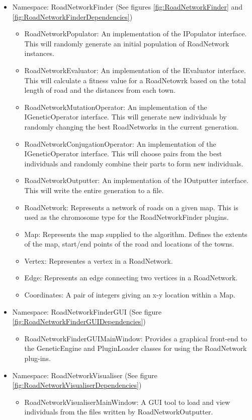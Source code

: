 \begin{itemize}
\item Namespace: RoadNetworkFinder (See figures \ref{fig:RoadNetworkFinder} and \ref{fig:RoadNetworkFinderDependencies})
	\begin{itemize}
	\item RoadNetworkPopulator: An implementation of the IPopulator interface. This will randomly generate an initial population of RoadNetwork instances.
	\item RoadNetworkEvaluator: An implementation of the IEvaluator interface. This will calculate a fitness value for a RoadNetowrk based on the total length of road and the distances from each town.
	\item RoadNetworkMutationOperator: An implementation of the IGeneticOperator interface. This will generate new individuals by randomly changing the best RoadNetworks in the current generation.
	\item RoadNetworkConjugationOperator: An implementation of the IGeneticOperator interface. This will choose pairs from the best individuals and randomly combine their parts to form new individuals.
	\item RoadNetworkOutputter: An implementation of the IOutputter interface. This will write the entire generation to a file.
	\item RoadNetwork: Represents a network of roads on a given map. This is used as the chromosome type for the RoadNetworkFinder plugins.
	\item Map: Represents the map supplied to the algorithm. Defines the extents of the map, start/end points of the road and locations of the towns.
	\item Vertex: Representes a vertex in a RoadNetwork.
	\item Edge: Represents an edge connecting two vertices in a RoadNetwork.
	\item Coordinates: A pair of integers giving an x-y location within a Map.
	\end{itemize}
	
\item Namespace: RoadNetworkFinderGUI (See figure \ref{fig:RoadNetworkFinderGUIDependencies})
	\begin{itemize}
	\item RoadNetworkFinderGUIMainWindow: Provides a graphical front-end to the GeneticEngine and PluginLoader classes for using the RoadNetwork plug-ins.
	\end{itemize}
	
\item Namespace: RoadNetworkVisualiser (See figure \ref{fig:RoadNetworkVisualiserDependencies})
	\begin{itemize}
	\item RoadNetworkVisualiserMainWindow: A GUI tool to load and view individuals from the files written by RoadNetworkOutputter.
	\end{itemize}

\end{itemize}

